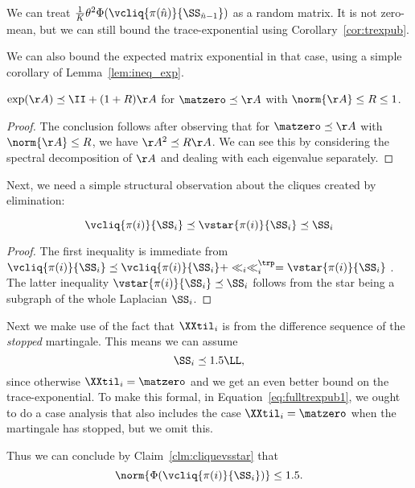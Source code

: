 We can treat
$\frac{1}{K}\theta^2\Phi(\vcliq{\pi(\hat{n})}{\SS_{\hat{n}-1}})$ as a random
matrix.
It is not zero-mean, but we can still bound the trace-exponential
using Corollary~\ref{cor:trexpub}.

We can also bound the expected matrix exponential in
that case, using a simple corollary of Lemma~\ref{lem:ineq_exp}.
\begin{corollary}\label{cor:ineq_exp_cher}
  $\exp(\AA) \preceq \II + (1+R)\AA $
  for $\matzero \preceq \AA$ with $\norm{\AA} \leq R \leq 1$.
\end{corollary}
\begin{proof}
  The conclusion follows after observing that for $\matzero \preceq \AA$ with $\norm{\AA} \leq R$,
  we have $\AA^2 \preceq R \AA$.
  We can see this by considering the spectral decomposition of $\AA$
  and dealing with each eigenvalue separately.
\end{proof}

Next, we need a simple structural observation about the cliques
created by elimination:
\begin{claim}
  \label{clm:cliquevsstar}
  \[
    \vcliq{\pi(i)}{\SS_i} \preceq \vstar{\pi(i)}{\SS_i} \preceq \SS_i
  \]
\end{claim}
\begin{proof}
  The first inequality is immediate from
  $
     \vcliq{\pi(i)}{\SS_i} \preceq   \vcliq{\pi(i)}{\SS_i} + \ll_i\ll_i^\trp
     =
     \vstar{\pi(i)}{\SS_i}
   $
   .
   The latter inequality $\vstar{\pi(i)}{\SS_i} \preceq \SS_i$
  follows from the star being a subgraph of the whole Laplacian $\SS_i$.
\end{proof}

Next we make use of the fact that $\XXtil_{i}$ is from the
difference sequence of the \emph{stopped} martingale.
This means we can assume
\[
  \SS_{i} \preceq 1.5 \LL,
\]
since
otherwise $\XXtil_{i} = \matzero$ and we get an even better
bound on the trace-exponential.
To make this formal, in Equation~\eqref{eq:fulltrexpub1},
we ought to do a case analysis that also includes
the case $\XXtil_{i} = \matzero$ when the martingale has
stopped, but we omit this.

Thus we can conclude by Claim~\ref{clm:cliquevsstar} that
\[
  \norm{\Phi(\vcliq{\pi(i)}{\SS_{i}})} \leq 1.5.
\]

